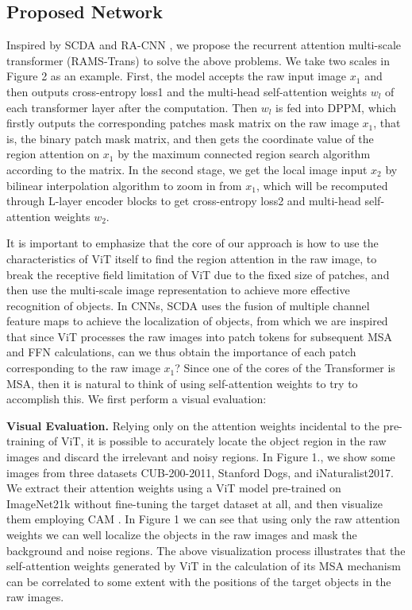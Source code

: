 \documentclass[sigconf]{acmart}
\begin{document}
\subsection{Proposed Network}
Inspired by SCDA \cite{SCDA} and RA-CNN \cite{RA-CNN}, we propose the recurrent attention multi-scale transformer (RAMS-Trans) to solve the above problems. We take two scales in Figure 2 as an example. First, the model accepts the raw input image $x_1$ and then outputs cross-entropy loss1 and the multi-head self-attention weights $w_l$ of each transformer layer after the computation. Then $w_l$ is fed into DPPM, which firstly outputs the corresponding patches mask matrix on the raw image $x_1$, that is, the binary patch mask matrix, and then gets the coordinate value of the region attention on $x_1$ by the maximum connected region search algorithm according to the matrix. In the second stage, we get the local image input $x_2$ by bilinear interpolation algorithm to zoom in from $x_1$, which will be recomputed through L-layer encoder blocks to get cross-entropy loss2 and multi-head self-attention weights $w_2$.

It is important to emphasize that the core of our approach is how to use the characteristics of ViT itself to find the region attention in the raw image, to break the receptive field limitation of ViT due to the fixed size of patches, and then use the multi-scale image representation to achieve more effective recognition of objects. In CNNs, SCDA uses the fusion of multiple channel feature maps to achieve the localization of objects, from which we are inspired that since ViT processes the raw images into patch tokens for subsequent MSA and FFN calculations, can we thus obtain the importance of each patch corresponding to the raw image $x_1$? Since one of the cores of the Transformer is MSA, then it is natural to think of using self-attention weights to try to accomplish this. We first perform a visual evaluation:

\textbf{Visual Evaluation.} Relying only on the attention weights incidental to the pre-training of ViT, it is possible to accurately locate the object region in the raw images and discard the irrelevant and noisy regions. In Figure 1., we show some images from three datasets CUB-200-2011, Stanford Dogs, and iNaturalist2017. We extract their attention weights using a ViT model pre-trained on ImageNet21k without fine-tuning the target dataset at all, and then visualize them employing CAM \cite{CAM}. In Figure 1 we can see that using only the raw attention weights we can well localize the objects in the raw images and mask the background and noise regions. The above visualization process illustrates that the self-attention weights generated by ViT in the calculation of its MSA mechanism can be correlated to some extent with the positions of the target objects in the raw images.
\end{document}
